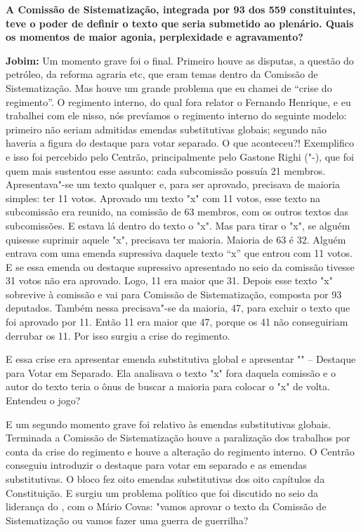 \textbf{A Comissão de Sistematização, integrada por 93 dos 559
constituintes, teve o poder de definir o texto que seria submetido ao
plenário. Quais os momentos de maior agonia, perplexidade e
agravamento?}

\textbf{Jobim:} Um momento grave foi o final. Primeiro houve as
disputas, a questão do petróleo, da reforma agraria etc, que eram temas
dentro da Comissão de Sistematização. Mas houve um grande problema que
eu chamei de ``crise do regimento''. O regimento interno, do qual fora
relator o Fernando Henrique, e eu trabalhei com ele nisso, nós prevíamos
o regimento interno do seguinte modelo: primeiro não seriam admitidas
emendas substitutivas globais; segundo não haveria a figura do destaque
para votar separado. O que aconteceu?! Exemplifico e isso foi percebido
pelo Centrão, principalmente pelo Gastone Righi ("-), que foi quem
mais sustentou esse assunto: cada subcomissão possuía 21 membros.
Apresentava"-se um texto qualquer e, para ser aprovado, precisava de
maioria simples: ter 11 votos. Aprovado um texto "x" com 11 votos, esse
texto na subcomissão era reunido, na comissão de 63 membros, com os
outros textos das subcomissões. E estava lá dentro do texto o "x". Mas
para tirar o "x", se alguém quisesse suprimir aquele "x", precisava ter
maioria. Maioria de 63 é 32. Alguém entrava com uma emenda supressiva
daquele texto ``x'' que entrou com 11 votos. E se essa emenda ou
destaque supressivo apresentado no seio da comissão tivesse 31 votos não
era aprovado. Logo, 11 era maior que 31. Depois esse texto "x" sobrevive
à comissão e vai para Comissão de Sistematização, composta por 93
deputados. Também nessa precisava"-se da maioria, 47, para excluir o
texto que foi aprovado por 11. Então 11 era maior que 47, porque os 41
não conseguiriam derrubar os 11. Por isso surgiu a crise do regimento.

E essa crise era apresentar emenda substitutiva global e apresentar
"" -- Destaque para Votar em Separado. Ela analisava o texto "x" fora
daquela comissão e o autor do texto teria o ônus de buscar a maioria
para colocar o "x" de volta. Entendeu o jogo?

E um segundo momento grave foi relativo às emendas substitutivas
globais. Terminada a Comissão de Sistematização houve a paralização dos
trabalhos por conta da crise do regimento e houve a alteração do
regimento interno. O Centrão conseguiu introduzir o destaque para votar
em separado e as emendas substitutivas. O bloco fez oito emendas
substitutivas dos oito capítulos da Constituição. E surgiu um problema
político que foi discutido no seio da liderança do , com o Mário
Covas: "vamos aprovar o texto da Comissão de Sistematização ou vamos
fazer uma guerra de guerrilha?

